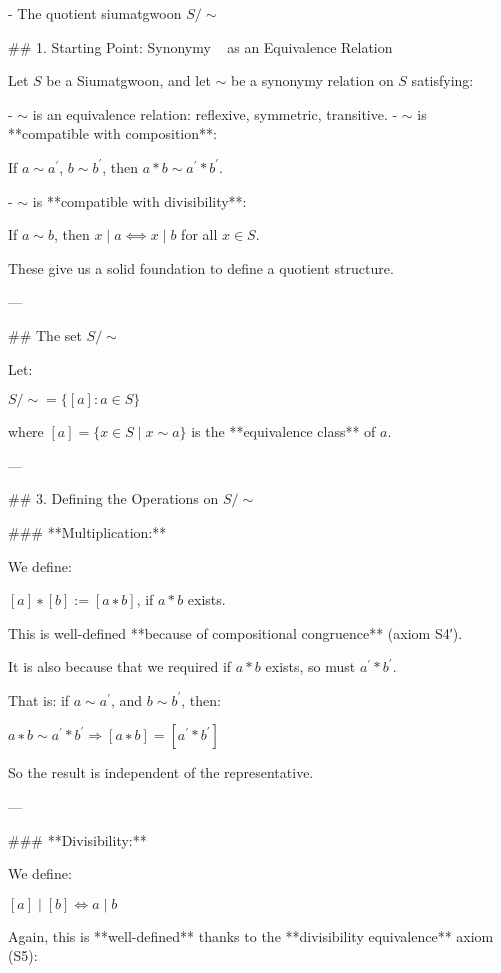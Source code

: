 - The quotient siumatgwoon $S/\sim$
    
    ## 1. Starting Point: Synonymy ~ as an Equivalence Relation
    
    Let $S$ be a Siumatgwoon, and let $\sim$ be a synonymy relation on $S$ satisfying:
    
    - $\sim$ is an equivalence relation: reflexive, symmetric, transitive.
    - $\sim$ is **compatible with composition**:
        
        If $a\sim a^{'}$, $b\sim b^{'}$, then $a*b\sim a^{'}*b^{'}$.
        
    - $\sim$ is **compatible with divisibility**:
        
        If $a\sim b$, then $x∣a  ⟺  x∣b$ for all  $x\in S$.
        
    
    These give us a solid foundation to define a quotient structure.
    
    ---
    
    ## The set $S/\sim$
    
    Let:
    
    $S/∼=\{[a]:a\in S\}$
    
    where $[a]=\{x∈S∣x\sim a\}$ is the **equivalence class** of $a$.
    
    ---
    
    ## 3. Defining the Operations on $S/\sim$
    
    ### **Multiplication:**
    
    We define:
    
    $[a]∗[b]:=[a∗b]$, if $a*b$ exists.
    
    This is well-defined **because of compositional congruence** (axiom S4′).
    
    It is also because that we required if $a*b$ exists, so must $a^{'}*b^{'}$.
    
    That is: if $a \sim a^{'}$, and $b \sim b^{'}$, then:
    
    $a∗b∼a^{'}*b^{'}\Rightarrow [a∗b]=[a^{'}*b^{'}]$
    
    So the result is independent of the representative.
    
    ---
    
    ### **Divisibility:**
    
    We define:
    
    $[a]∣[b] \iff  a∣b$
    
    Again, this is **well-defined** thanks to the **divisibility equivalence** axiom (S5):
    
